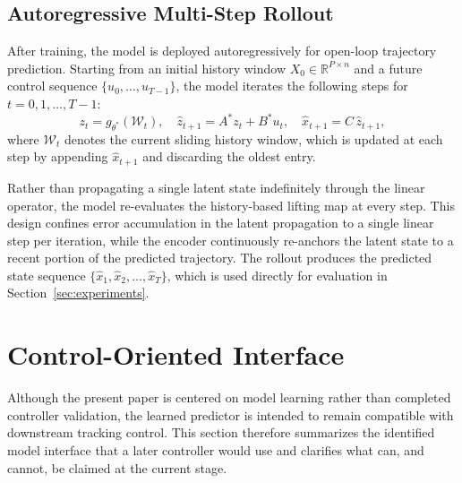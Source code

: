\documentclass[journal]{IEEEtran}
\begin{document}
\subsection{Autoregressive Multi-Step Rollout}
\label{sec:rollout}

After training, the model is deployed autoregressively for open-loop trajectory prediction. Starting from an initial history window $X_0 \in \mathbb{R}^{P \times n}$ and a future control sequence $\{u_0,\ldots,u_{T-1}\}$, the model iterates the following steps for $t=0,1,\ldots,T-1$:
\begin{equation}
    z_t = g_{\theta^*}(\mathcal{W}_t), \quad
    \hat{z}_{t+1} = A^* z_t + B^* u_t, \quad
    \hat{x}_{t+1} = C\,\hat{z}_{t+1},
    \label{eq:rollout_step}
\end{equation}
where $\mathcal{W}_t$ denotes the current sliding history window, which is updated at each step by appending $\hat{x}_{t+1}$ and discarding the oldest entry.

Rather than propagating a single latent state indefinitely through the linear operator, the model re-evaluates the history-based lifting map at every step. This design confines error accumulation in the latent propagation to a single linear step per iteration, while the encoder continuously re-anchors the latent state to a recent portion of the predicted trajectory. The rollout produces the predicted state sequence $\{\hat{x}_1,\hat{x}_2,\ldots,\hat{x}_T\}$, which is used directly for evaluation in Section~\ref{sec:experiments}.

\section{Control-Oriented Interface}
\label{sec:control}

Although the present paper is centered on model learning rather than completed controller validation, the learned predictor is intended to remain compatible with downstream tracking control. This section therefore summarizes the identified model interface that a later controller would use and clarifies what can, and cannot, be claimed at the current stage.
\end{document}

